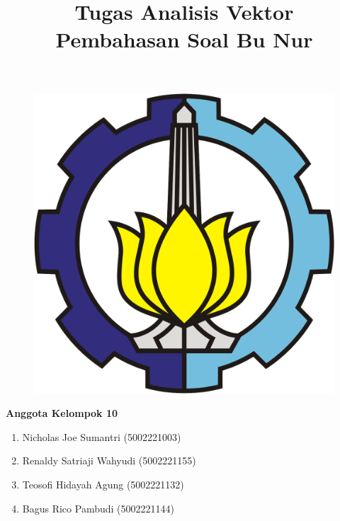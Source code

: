 \documentclass[a4paper,12pt]{article}
\title{\textbf{Tugas Analisis Vektor} 
\vspace{0.5cm}
\\ \large \textbf{Pembahasan Soal Bu Nur}}
\date{}
\begin{document}
\begin{titlepage}

\maketitle
\thispagestyle{empty}

\begin{figure}[h]
    \centering
    \includegraphics[width=0.5\linewidth]{logoITS.png}
\end{figure}

\begin{center}
\textbf{Anggota Kelompok 10}
\end{center}
\begin{enumerate}
    \item Nicholas Joe Sumantri \hfill (5002221003)
    \item Renaldy Satriaji  Wahyudi \hfill (5002221155)
    \item Teosofi Hidayah Agung \hfill (5002221132)
    \item Bagus Rico Pambudi \hfill (5002221144)
\end{enumerate}

\end{titlepage}
\end{document}
